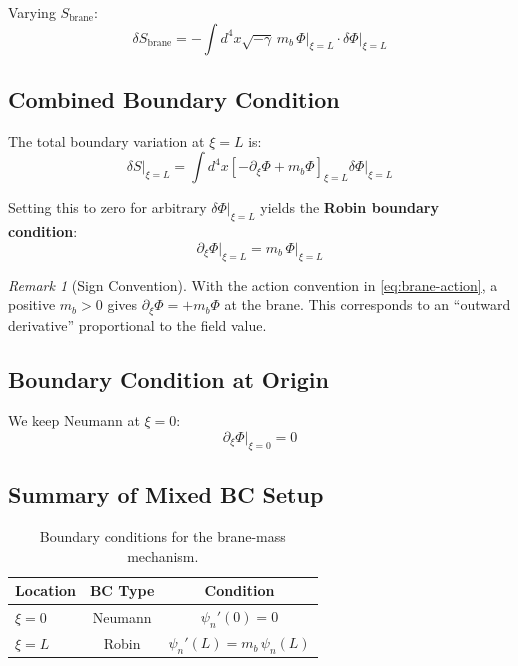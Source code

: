 \documentclass[11pt,a4paper]{article}
\newcommand{\mb}{m_b}
\theoremstyle{definition}
\theoremstyle{plain}
\theoremstyle{remark}
\newtheorem{remark}{Remark}[section]
\begin{document}
Varying $S_{\mathrm{brane}}$:
\begin{equation}
\delta S_{\mathrm{brane}} = -\int d^4x \sqrt{-\gamma} \, \mb\, \Phi\big|_{\xi=L} \cdot \delta\Phi\big|_{\xi=L}
\label{eq:brane-variation}
\end{equation}

\subsection{Combined Boundary Condition}

The total boundary variation at $\xi = L$ is:
\begin{equation}
\delta S\big|_{\xi=L} = \int d^4x \left[ -\partial_\xi\Phi + \mb\Phi \right]_{\xi=L} \delta\Phi\big|_{\xi=L}
\label{eq:combined-variation}
\end{equation}

Setting this to zero for arbitrary $\delta\Phi|_{\xi=L}$ yields the \textbf{Robin boundary condition}:
\begin{equation}
\boxed{\partial_\xi\Phi\big|_{\xi=L} = \mb\,\Phi\big|_{\xi=L}}
\label{eq:robin-bc}
\end{equation}

\begin{remark}[Sign Convention]
With the action convention in \cref{eq:brane-action}, a positive $\mb > 0$ gives
$\partial_\xi\Phi = +\mb\Phi$ at the brane. This corresponds to an ``outward derivative''
proportional to the field value.
\end{remark}

\subsection{Boundary Condition at Origin}

We keep Neumann at $\xi = 0$:
\begin{equation}
\partial_\xi\Phi\big|_{\xi=0} = 0
\label{eq:neumann-origin}
\end{equation}

\subsection{Summary of Mixed BC Setup}

\begin{table}[htbp]
\centering
\caption{Boundary conditions for the brane-mass mechanism.}
\label{tab:bc-summary}
\begin{tabular}{@{}lcc@{}}
\toprule
Location & BC Type & Condition \\
\midrule
$\xi = 0$ & Neumann & $\psi_n'(0) = 0$ \\
$\xi = L$ & Robin & $\psi_n'(L) = \mb\,\psi_n(L)$ \\
\bottomrule
\end{tabular}
\end{table}
\end{document}
